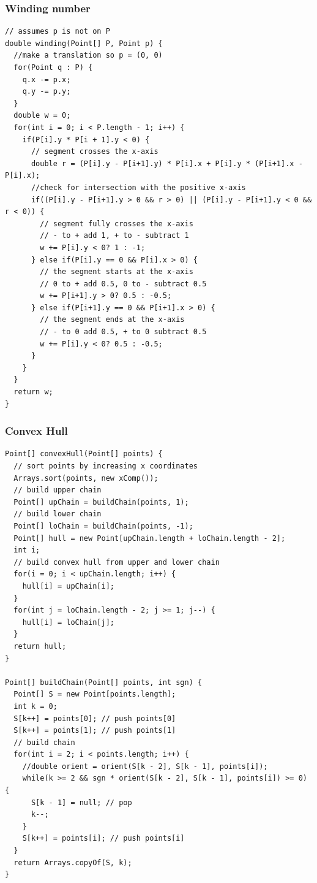 \subsubsection{Winding number}
\begin{lstlisting}
// assumes p is not on P
double winding(Point[] P, Point p) {
  //make a translation so p = (0, 0)
  for(Point q : P) {
    q.x -= p.x;
    q.y -= p.y;
  }
  double w = 0;
  for(int i = 0; i < P.length - 1; i++) {
    if(P[i].y * P[i + 1].y < 0) {
      // segment crosses the x-axis
      double r = (P[i].y - P[i+1].y) * P[i].x + P[i].y * (P[i+1].x - P[i].x);
      //check for intersection with the positive x-axis
      if((P[i].y - P[i+1].y > 0 && r > 0) || (P[i].y - P[i+1].y < 0 && r < 0)) {
        // segment fully crosses the x-axis
        // - to + add 1, + to - subtract 1
        w += P[i].y < 0? 1 : -1;
      } else if(P[i].y == 0 && P[i].x > 0) {
        // the segment starts at the x-axis
        // 0 to + add 0.5, 0 to - subtract 0.5
        w += P[i+1].y > 0? 0.5 : -0.5;
      } else if(P[i+1].y == 0 && P[i+1].x > 0) {
        // the segment ends at the x-axis
        // - to 0 add 0.5, + to 0 subtract 0.5
        w += P[i].y < 0? 0.5 : -0.5;
      }
    }
  }
  return w;
}
\end{lstlisting}
\subsubsection{Convex Hull}
\begin{lstlisting}
Point[] convexHull(Point[] points) {
  // sort points by increasing x coordinates
  Arrays.sort(points, new xComp());
  // build upper chain
  Point[] upChain = buildChain(points, 1);
  // build lower chain
  Point[] loChain = buildChain(points, -1);
  Point[] hull = new Point[upChain.length + loChain.length - 2];
  int i;
  // build convex hull from upper and lower chain
  for(i = 0; i < upChain.length; i++) {
    hull[i] = upChain[i];
  }
  for(int j = loChain.length - 2; j >= 1; j--) {
    hull[i] = loChain[j];
  }
  return hull;
}

Point[] buildChain(Point[] points, int sgn) {
  Point[] S = new Point[points.length];
  int k = 0;
  S[k++] = points[0]; // push points[0]
  S[k++] = points[1]; // push points[1]
  // build chain
  for(int i = 2; i < points.length; i++) {
    //double orient = orient(S[k - 2], S[k - 1], points[i]);
    while(k >= 2 && sgn * orient(S[k - 2], S[k - 1], points[i]) >= 0) {
      S[k - 1] = null; // pop
      k--;
    }
    S[k++] = points[i]; // push points[i]
  }
  return Arrays.copyOf(S, k);
}
\end{lstlisting}

